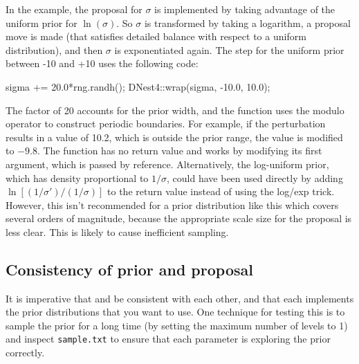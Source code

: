 \documentclass[article, nojss]{jss}
\begin{document}
In the example, the proposal for $\sigma$ is implemented by taking advantage
of the uniform prior for $\ln(\sigma)$. So $\sigma$ is transformed by
taking a logarithm, a proposal move is made (that satisfies detailed balance
with respect to a uniform distribution), and then $\sigma$ is exponentiated
again. The step for the uniform prior between -10 and +10
uses the following code:
\begin{CodeChunk}
\begin{CodeInput}
sigma += 20.0*rng.randh();
DNest4::wrap(sigma, -10.0, 10.0);
\end{CodeInput}
\end{CodeChunk}
The factor of 20 accounts for the prior width, and
the  function uses the modulo operator
to construct periodic boundaries. For example, if the perturbation results
in a value of 10.2, which is outside the prior range, the value is modified to
$-9.8$.
The  function has no return value and works by modifying its
first argument, which is passed by reference.
Alternatively, the log-uniform prior, which has density proportional
to $1/\sigma$, could have been used directly by adding
$\ln\left[(1/\sigma')/(1/\sigma)\right]$ to the
return value instead of using the log/exp trick.
However, this isn't recommended for a prior distribution like this
which covers several orders of magnitude, because the appropriate scale size
for the proposal is less clear. This is likely to cause inefficient
sampling.

\subsection{Consistency of prior and proposal}
It is imperative that  and
be consistent with each other, and that each implements
the prior distributions that you want to use. One technique
for testing this is to sample the prior for a long time
(by setting the maximum number of levels to 1) and inspect
{\tt sample.txt} to ensure that each parameter is exploring
the prior correctly.
\end{document}
